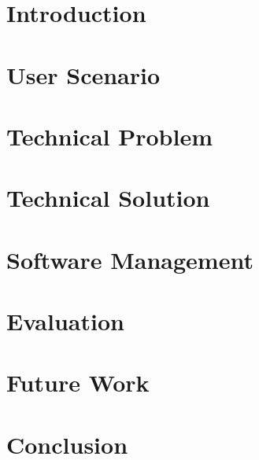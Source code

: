 \documentclass[10pt, a4paper]{report} %
\begin{document}



\onecolumn %

\section{Introduction}


\section{User Scenario}


\section{Technical Problem}


\section{Technical Solution}


\section{Software Management}


\section{Evaluation}


\section{Future Work}


\section{Conclusion}


\cleardoublepage{}


\cleardoublepage{}
\printbibliography[]
\end{document}

